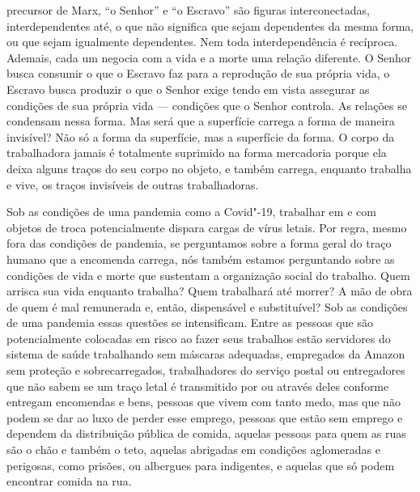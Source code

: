 \begin{multicols}{2}
\vspace{\baselineskip}

{\small{}}

\vspace{\baselineskip}

\noindent{}precursor de Marx, ``o Senhor'' e ``o
Escravo'' são figuras interconectadas, interdependentes até, o que não
significa que sejam dependentes da mesma forma, ou que sejam igualmente
dependentes. Nem toda interdependência é recíproca. Ademais, cada um
negocia com a vida e a morte uma relação diferente. O Senhor busca
consumir o que o Escravo faz para a reprodução de sua própria vida, o
Escravo busca produzir o que o Senhor exige tendo em vista assegurar as
condições de sua própria vida --- condições que o Senhor controla. As
relações se condensam nessa forma. Mas será que a superfície carrega a
forma de maneira invisível? Não só a forma da superfície, mas a
superfície da forma. O corpo da trabalhadora jamais é totalmente
suprimido na forma mercadoria porque ela deixa alguns traços do seu
corpo no objeto, e também carrega, enquanto trabalha e vive, os traços
invisíveis de outras trabalhadoras.

Sob as condições de uma pandemia como a Covid"-19, trabalhar em e com
objetos de troca potencialmente dispara cargas de vírus letais. Por
regra, mesmo fora das condições de pandemia, se perguntamos sobre a
forma geral do traço humano que a encomenda carrega, nós também estamos
perguntando sobre as condições de vida e morte que sustentam a
organização social do trabalho. Quem arrisca sua vida enquanto trabalha?
Quem trabalhará até morrer? A mão de obra de quem é mal remunerada e,
então, dispensável e substituível? Sob as condições de uma pandemia
essas questões se intensificam. Entre as pessoas que são potencialmente
colocadas em risco ao fazer seus trabalhos estão servidores do sistema
de saúde trabalhando sem máscaras adequadas, empregados da Amazon sem
proteção e sobrecarregados, trabalhadores do serviço postal ou
entregadores {} que não sabem se um traço letal é
transmitido por ou através deles conforme entregam encomendas e bens,
pessoas que vivem com tanto medo, mas que não podem se dar ao luxo de
perder esse emprego, pessoas que estão sem emprego e dependem da
distribuição pública de comida, aquelas pessoas para quem as ruas são o
chão e também o teto, aquelas abrigadas em condições aglomeradas e
perigosas, como prisões, ou albergues para indigentes, e aquelas que só
podem encontrar comida na rua.


\end{multicols}
